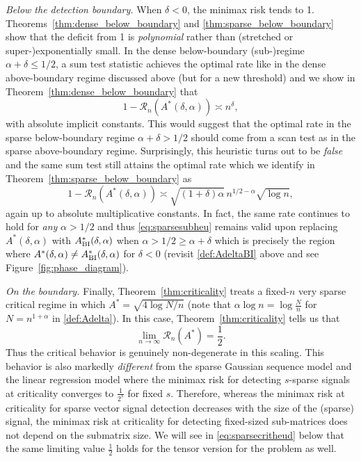 \documentclass[11pt,reqno,letterpaper]{amsart}
\numberwithin{equation}{section}
\theoremstyle{plain}
\begin{document}
\noindent\emph{Below the detection boundary.}
When $\delta < 0$, the minimax risk 
tends to 1. Theorems~\ref{thm:dense_below_boundary} and \ref{thm:sparse_below_boundary} show 
that the deficit from 1 is {\em polynomial} rather than (stretched or 
super-)exponentially small. In the dense below-boundary (sub-)regime $\alpha+\delta\le1/2$, 
a sum test statistic achieves the optimal rate like in the dense above-boundary regime 
discussed above (but for a new threshold) and we show in 
Theorem~\ref{thm:dense_below_boundary} that
\begin{equation}\label{eq:densesubheu}
1-\mathcal R_n(A^\ast(\delta, \alpha))\asymp n^{\delta},
\end{equation}
with absolute implicit constants. This would suggest that the optimal rate in the sparse 
below-boundary regime $\alpha + \delta > 1/2$ should come from a scan test as 
in the \sloppy sparse above-boundary regime. Surprisingly, this heuristic turns out to be {\em false} and the same sum test still attains the optimal rate which we 
identify in Theorem~\ref{thm:sparse_below_boundary} as
\begin{equation}\label{eq:sparsesubheu}
1-\mathcal R_n(A^\ast(\delta, \alpha))
    \asymp \sqrt{(1+\delta)\alpha}\, n^{1/2-\alpha}\sqrt{\log n},
\end{equation}
again up to absolute multiplicative constants. In fact, the same rate continues to 
hold for {\em any} $\alpha > 1/2$ and thus \eqref{eq:sparsesubheu} remains valid 
upon replacing $A^\ast(\delta, \alpha)$ with $A^\ast_{{\rm BI}}(\delta, \alpha)$ when $\alpha > 1/2 \ge \alpha + \delta$ which is precisely the region where $A^\ast(\delta, \alpha) \neq A^\ast_{{\rm BI}}(\delta, \alpha)$ for $\delta < 0$ (revisit \eqref{def:AdeltaBI} above and see Figure~\ref{fig:phase_diagram}).



\smallskip

\noindent\emph{On the boundary.}
Finally, Theorem~\ref{thm:criticality} treats a fixed-$n$ very sparse critical regime in which $A^\ast = \sqrt{4\log N/n}$ (note that $\alpha \log n = \log \frac Nn$ for $N = n^{1 + \alpha}$ in \eqref{def:Adelta}). In this case, 
Theorem~\ref{thm:criticality} tells us that
\begin{equation}\label{eq:sparsecritheu}    
\lim_{n \to \infty} \mathcal R_n(A^\ast) = \frac12.
\end{equation}
Thus the critical behavior is genuinely non-degenerate in this scaling. This 
behavior is also markedly {\em different} from the sparse Gaussian 
sequence model and the linear regression model \citep{ingster2012nonparametric, mukherjee2020minimax} where the minimax risk for detecting $s$-sparse signals at 
criticality converges to $\frac1{2^s}$ for fixed $s$. Therefore, whereas the 
minimax risk at criticality for sparse vector signal detection decreases with the 
size of the (sparse) signal, the minimax risk at criticality for detecting fixed-sized sub-matrices does not depend on the submatrix size. We will see in 
\eqref{eq:sparsecritheud} below that the same limiting value $\frac12$ holds for 
the tensor version for the problem as well.
\end{document}
